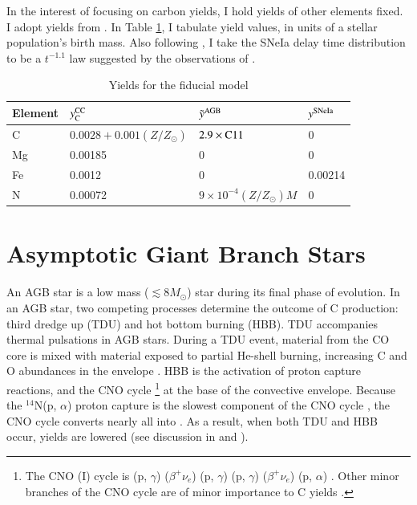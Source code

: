 \documentclass[12pt,oneside]{report}
\newcommand{\Ycc}{\ensuremath{y_{\rm C}^{\rm CC}}}
\newcommand{\sun}{\ensuremath{\odot}}
\newcommand{\alp}{$\alpha$}
\begin{document}
In the interest of focusing on carbon yields, I hold yields of other elements fixed. 
I adopt yields from \citet{james+21, james+23}.
In Table \ref{tab:fiducial_mod}, I tabulate yield values, in units of a stellar population's birth mass.
Also following \citet{james+21, james+23}, I take the SNeIa delay time distribution to be a
$t^{-1.1}$ law suggested by the observations of \citet{maoz+12}.


\begin{table}
	\centering
    \caption[Fiducial Model]{Yields for the fiducial model}
	\label{tab:fiducial_mod}

	\begin{tabular}{l l l l}
		\toprule
        Element & $\Ycc$ & $\tilde{y}^{\rm AGB}$ & $y^{\rm SNe Ia}$ \\
		\midrule
        C & $0.0028 + 0.001(Z/Z_\odot)$ & $2.9\times{\rm C11}$ &  0 \\
        Mg & 0.00185 & 0 & 0 \\
        Fe & 0.0012 & 0 & 0.00214 \\
        N & 0.00072 & $9\times10^{-4}(Z/Z_\odot)M$ & 0\\
		\bottomrule
	\end{tabular}
\end{table}

\section{Asymptotic Giant Branch Stars}\label{sec:agb}


An AGB star is a low mass ($\lesssim 8 M_{\sun}$) star during its final phase of evolution.  In an AGB star, two competing processes determine the outcome of C production: third dredge up (TDU) and hot bottom burning (HBB).  TDU accompanies thermal pulsations in AGB stars. During a TDU event, material from the CO core is mixed with material exposed to partial He-shell burning, increasing C and O abundances in the envelope \citep{KL14}.
HBB is the activation of proton capture reactions, and the CNO cycle%
\footnote{The CNO (I) cycle is
(p, $\gamma$)
($\beta^+ \nu_e$)
(p, $\gamma$)
(p, $\gamma$)
($\beta^{+}\nu_e$)
(p, \alp)
.
 Other minor branches of the CNO cycle are of minor importance to C yields
 \citep{solar-fusion}.
}
at the base of the convective envelope. Because the $^{14}$N(p, $\alpha$) proton capture is the slowest component of the CNO cycle \citep{solar-fusion}, the CNO cycle converts nearly all  into .
As a result, when both TDU and HBB occur,  yields are lowered (see discussion in \citealt{james+23} and \citealt{ventura+13}).
\end{document}
